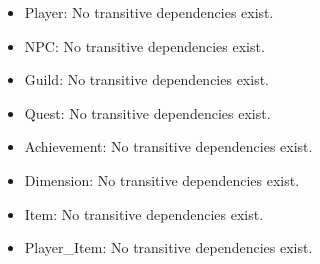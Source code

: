 \documentclass{article}
\begin{document}
\begin{itemize}
    \item Player: No transitive dependencies exist.
    \item NPC: No transitive dependencies exist.
    \item Guild: No transitive dependencies exist.
    \item Quest: No transitive dependencies exist.
    \item Achievement: No transitive dependencies exist.
    \item Dimension: No transitive dependencies exist.
    \item Item: No transitive dependencies exist.
    \item Player\_Item: No transitive dependencies exist.
\end{itemize}
\end{document}
